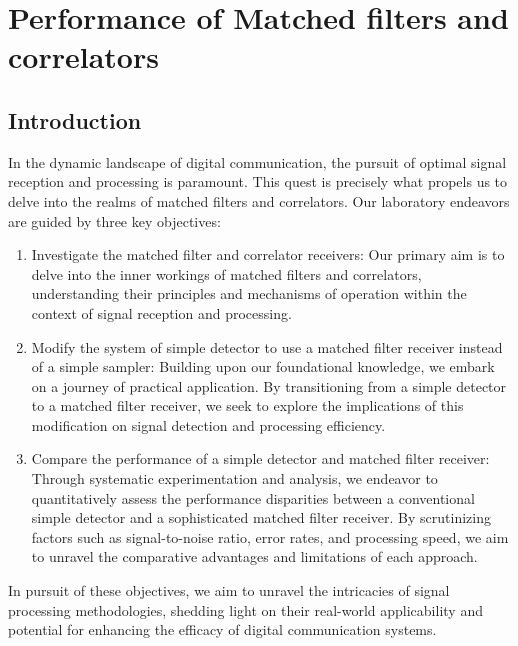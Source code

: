 \documentclass[a4paper, 12pt, english]{article}
\begin{document}

\newpage
\section{Performance of Matched filters and correlators}
\subsection{Introduction}
In the dynamic landscape of digital communication, the pursuit of optimal signal reception and processing is paramount. This quest is precisely what propels us to delve into the realms of matched filters and correlators. Our laboratory endeavors are guided by three key objectives:
\newline

\begin{enumerate}
    \item Investigate the matched filter and correlator receivers: Our primary aim is to delve into the inner workings of matched filters and correlators, understanding their principles and mechanisms of operation within the context of signal reception and processing.
    \item Modify the system of simple detector to use a matched filter receiver instead of a simple sampler: Building upon our foundational knowledge, we embark on a journey of practical application. By transitioning from a simple detector to a matched filter receiver, we seek to explore the implications of this modification on signal detection and processing efficiency.
    \item Compare the performance of a simple detector and matched filter receiver: Through systematic experimentation and analysis, we endeavor to quantitatively assess the performance disparities between a conventional simple detector and a sophisticated matched filter receiver. By scrutinizing factors such as signal-to-noise ratio, error rates, and processing speed, we aim to unravel the comparative advantages and limitations of each approach.
\end{enumerate}

\noindent In pursuit of these objectives, we aim to unravel the intricacies of signal processing methodologies, shedding light on their real-world applicability and potential for enhancing the efficacy of digital communication systems.
\end{document}
